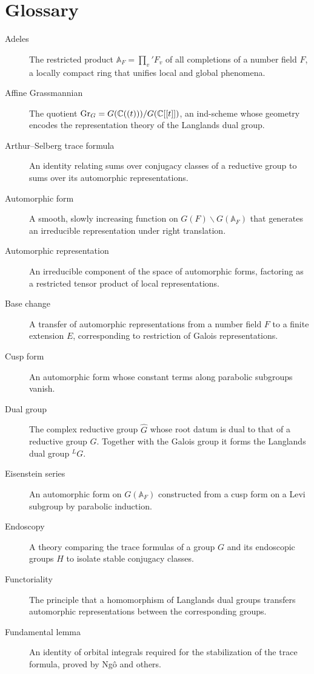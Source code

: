 \section*{Glossary}
\begin{description}
\item[Adeles] The restricted product \(\mathbb{A}_F = \prod_v' F_v\) of all completions of a number field \(F\), a locally compact ring that unifies local and global phenomena.
\item[Affine Grassmannian] The quotient \(\operatorname{Gr}_G = G(\mathbb{C}((t)))/G(\mathbb{C}[[t]])\), an ind-scheme whose geometry encodes the representation theory of the Langlands dual group.
\item[Arthur--Selberg trace formula] An identity relating sums over conjugacy classes of a reductive group to sums over its automorphic representations.
\item[Automorphic form] A smooth, slowly increasing function on \(G(F)\backslash G(\mathbb{A}_F)\) that generates an irreducible representation under right translation.
\item[Automorphic representation] An irreducible component of the space of automorphic forms, factoring as a restricted tensor product of local representations.
\item[Base change] A transfer of automorphic representations from a number field \(F\) to a finite extension \(E\), corresponding to restriction of Galois representations.
\item[Cusp form] An automorphic form whose constant terms along parabolic subgroups vanish.
\item[Dual group] The complex reductive group \(\widehat{G}\) whose root datum is dual to that of a reductive group \(G\). Together with the Galois group it forms the Langlands dual group \({}^L G\).
\item[Eisenstein series] An automorphic form on \(G(\mathbb{A}_F)\) constructed from a cusp form on a Levi subgroup by parabolic induction.
\item[Endoscopy] A theory comparing the trace formulas of a group \(G\) and its endoscopic groups \(H\) to isolate stable conjugacy classes.
\item[Functoriality] The principle that a homomorphism of Langlands dual groups transfers automorphic representations between the corresponding groups.
\item[Fundamental lemma] An identity of orbital integrals required for the stabilization of the trace formula, proved by Ng\^{o} and others.

\end{description}
